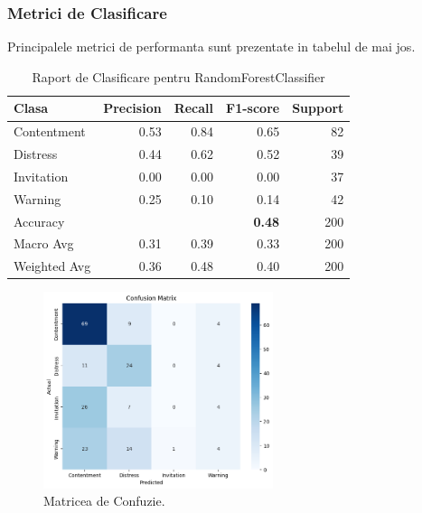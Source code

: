 \documentclass[11pt, a4paper]{article}
\begin{document}
\subsubsection{Metrici de Clasificare}
Principalele metrici de performanta sunt prezentate in tabelul de mai jos.

\begin{table}[H]
\centering
\caption{Raport de Clasificare pentru RandomForestClassifier}
\label{tab:classification_report_final}
\begin{tabular}{@{}lrrrr@{}}
\toprule
\textbf{Clasa} & \textbf{Precision} & \textbf{Recall} & \textbf{F1-score} & \textbf{Support} \\
\midrule
Contentment & 0.53 & 0.84 & 0.65 & 82 \\
Distress    & 0.44 & 0.62 & 0.52 & 39 \\
Invitation  & 0.00 & 0.00 & 0.00 & 37 \\
Warning     & 0.25 & 0.10 & 0.14 & 42 \\
\midrule
Accuracy    &      &      & \textbf{0.48} & 200 \\
Macro Avg   & 0.31 & 0.39 & 0.33 & 200 \\
Weighted Avg& 0.36 & 0.48 & 0.40 & 200 \\
\bottomrule
\end{tabular}
\end{table}

\begin{figure}[H]
    \centering
    \includegraphics[width=0.6\textwidth]{dazed_and_confused.png}
    \caption{Matricea de Confuzie.}
    \label{fig:conf_matrix_rf_final}
\end{figure}
\end{document}
